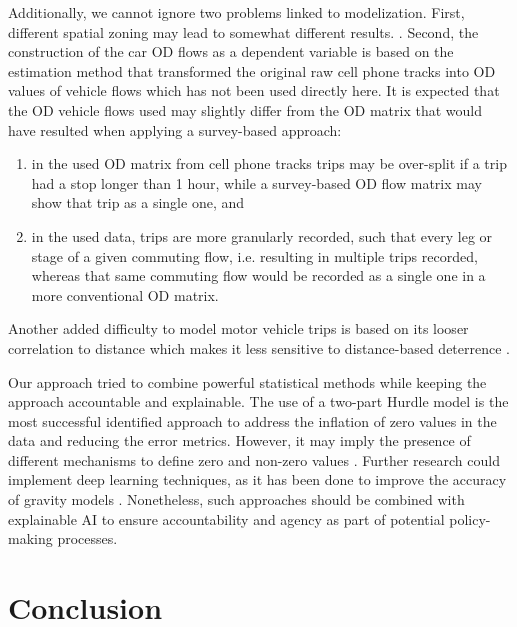 Additionally, we cannot ignore two problems linked to modelization. First, different spatial zoning may lead to somewhat different results.  \citep{LeSage2010SpatialFlows}. Second, the construction of the car OD flows as a dependent variable is based on the estimation method that transformed the original raw cell phone tracks into OD values of vehicle flows \citep{Calvet2020ObtencioM2019} which has not been used directly here. It is expected that the OD vehicle flows used may slightly differ from the OD matrix that would have resulted when applying a survey-based approach: 
\begin{enumerate}
    \item in the used OD matrix from cell phone tracks trips may be over-split if a trip had a stop longer than 1 hour, while a survey-based OD flow matrix may show that trip as a single one, and 
    \item in the used data, trips are more granularly recorded, such that every leg or stage of a given commuting flow, i.e. %
   resulting in multiple trips recorded, whereas that same commuting flow would be recorded as a single one in a more conventional OD matrix. 
\end{enumerate}

Another added difficulty to model motor vehicle trips is based on its looser correlation to distance which makes it less sensitive to distance-based deterrence \citep{PerezSans2021}. 

Our approach tried to combine powerful statistical methods while keeping the approach accountable and explainable. 
The use of a two-part Hurdle model is the most successful identified approach to address the inflation of zero values in the data and reducing the error metrics. However, it may imply the presence of different mechanisms to define zero and non-zero values \citep{Cameron2013RegressionData}. 
Further research could implement deep learning techniques, as it has been done to improve the accuracy of gravity models \citep{Simini2021AGeneration}. Nonetheless, such approaches should be combined with explainable AI to ensure accountability and agency as part of potential policy-making processes. 

\section{Conclusion}
\label{sec:ETRCO2H_conclusion}


